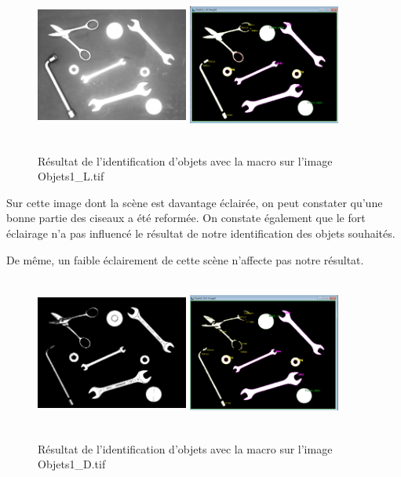 \documentclass{scrreprt}
\begin{document}
\begin{figure}[!h]
\centering
\includegraphics[width=5cm, height=5cm]{images/objet1Lo.png}\hfill
\includegraphics[width=5cm, height=5cm]{images/objet1L.png}
\caption{Résultat de l'identification d'objets avec la macro sur l'image Objets1_L.tif}
\end{figure}

Sur cette image dont la scène est davantage éclairée, on peut constater qu'une bonne partie
des ciseaux a été reformée. On constate également que le fort éclairage n'a pas influencé 
le résultat de notre identification des objets souhaités. 

\newpage
De même, un faible éclairement de cette scène n'affecte pas notre résultat.

\begin{figure}[!h]
\centering
\includegraphics[width=5cm, height=5cm]{images/objet1Do.png}\hfill
\includegraphics[width=5cm, height=5cm]{images/objet1D.png}
\caption{Résultat de l'identification d'objets avec la macro sur l'image Objets1_D.tif}
\end{figure}
\end{document}
